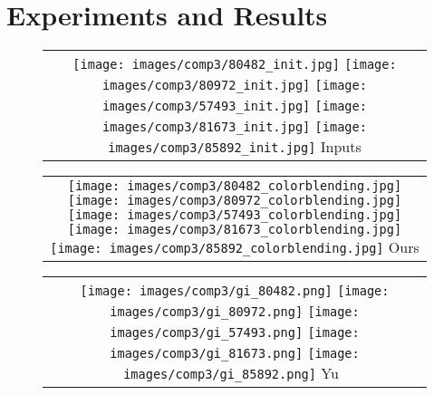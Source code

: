 \documentclass[runningheads]{llncs}
\begin{document}
\section{Experiments and Results}


\begin{figure}[b!]
\begin{tabular}{@{}c@{}}
    \centering
    \raisebox{-.5\height} {
    \texttt{[image: images/comp3/80482\_init.jpg]}\hspace{-0.06 cm}
    \texttt{[image: images/comp3/80972\_init.jpg]}\hspace{-0.06 cm}
    \texttt{[image: images/comp3/57493\_init.jpg]}\hspace{-0.06 cm}
    \texttt{[image: images/comp3/81673\_init.jpg]}\hspace{-0.06 cm}
    \texttt{[image: images/comp3/85892\_init.jpg]}
    } Inputs
\end{tabular}

\begin{tabular}{@{}c@{}}
    \centering
    \raisebox{-.5\height} {
    \texttt{[image: images/comp3/80482\_colorblending.jpg]}\hspace{-0.06 cm}
    \texttt{[image: images/comp3/80972\_colorblending.jpg]}\hspace{-0.06 cm}
    \texttt{[image: images/comp3/57493\_colorblending.jpg]}\hspace{-0.06 cm}
    \texttt{[image: images/comp3/81673\_colorblending.jpg]}\hspace{-0.06 cm}
    \texttt{[image: images/comp3/85892\_colorblending.jpg]}
    }  Ours 
\end{tabular}

\begin{tabular}{@{}c@{}}
    \centering
    \raisebox{-.5\height} {
    \texttt{[image: images/comp3/gi\_80482.png]}\hspace{-0.06 cm}
    \texttt{[image: images/comp3/gi\_80972.png]}\hspace{-0.06 cm}
    \texttt{[image: images/comp3/gi\_57493.png]}\hspace{-0.06 cm}
    \texttt{[image: images/comp3/gi\_81673.png]}\hspace{-0.06 cm}
    \texttt{[image: images/comp3/gi\_85892.png]}
    } Yu~\cite{yu2018generative}
\end{tabular}


\end{figure}
\end{document}
